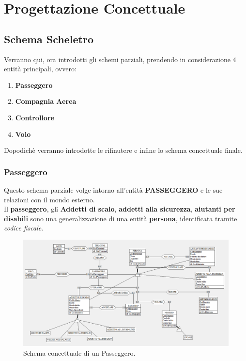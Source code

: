 
\newpage

\section{Progettazione Concettuale}

\subsection{Schema Scheletro}

\textsf{\small Verranno qui, ora introdotti gli schemi parziali, prendendo in considerazione 4 entità principali, ovvero: }
\begin{enumerate}
	\item \textbf{Passeggero}
	\item \textbf{Compagnia Aerea}
	\item \textbf{Controllore}
	\item \textbf{Volo}
\end{enumerate}

\textsf{\small Dopodichè verranno introdotte le rifinutere e infine lo schema concettuale finale.}\\ %


\subsubsection{Passeggero}

\textsf{\small Questo schema parziale volge intorno all'entità \textbf{PASSEGGERO} e le sue relazioni con il mondo esterno.}\\ %

\textsf{\small Il \textbf{passeggero}, gli \textbf{Addetti di scalo}, \textbf{addetti alla sicurezza}, \textbf{aiutanti per disabili} sono una generalizzazione di una entità \textbf{persona}, identificata tramite \emph{codice fiscale}.}\\ %

\begin{figure}[H] %
	\centering
	\includegraphics[width=1.2\textwidth, height=1.2\textheight, keepaspectratio]{./img/Passeggero.png}
	\caption{Schema concettuale di un Passeggero.}
	\label{fig:schema_passeggero}
\end{figure}

